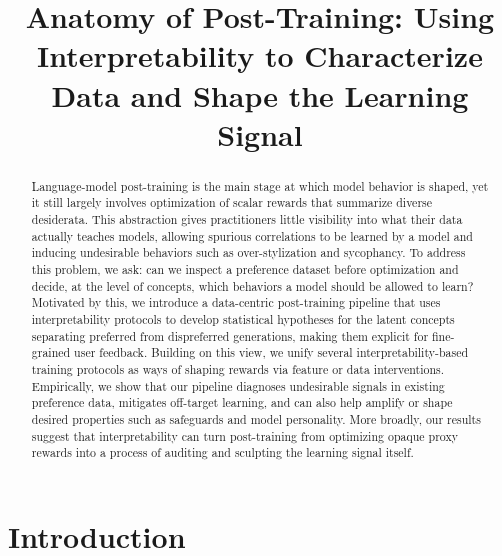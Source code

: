 \documentclass{article} %
\author{\paperauthors}
\title{Anatomy of Post-Training: Using Interpretability to Characterize Data and Shape the Learning Signal
}
\begin{document}
\maketitle

\vspace{-4mm}
\begin{abstract}
Language-model post-training is the main stage at which model behavior is shaped, yet it still largely involves optimization of scalar rewards that summarize diverse desiderata. 
% 
This abstraction gives practitioners little visibility into what their data actually teaches models, allowing spurious correlations to be learned by a model and inducing undesirable behaviors such as over-stylization and sycophancy. 
% 
To address this problem, we ask: can we inspect a preference dataset before optimization and decide, at the level of concepts, which behaviors a model should be allowed to learn? 
% 
Motivated by this, we introduce a data-centric post-training pipeline that uses interpretability protocols to develop statistical hypotheses for the latent concepts separating preferred from dispreferred generations, making them explicit for fine-grained user feedback. 
% 
Building on this view, we unify several interpretability-based training protocols as ways of shaping rewards via feature or data interventions. 
% 
Empirically, we show that our pipeline diagnoses undesirable signals in existing preference data, mitigates off-target learning, and can also help amplify or shape desired properties such as safeguards and model personality. 
% 
More broadly, our results suggest that interpretability can turn post-training from optimizing opaque proxy rewards into a process of auditing and sculpting the learning signal itself.
\end{abstract}




\section{Introduction}
\end{document}
